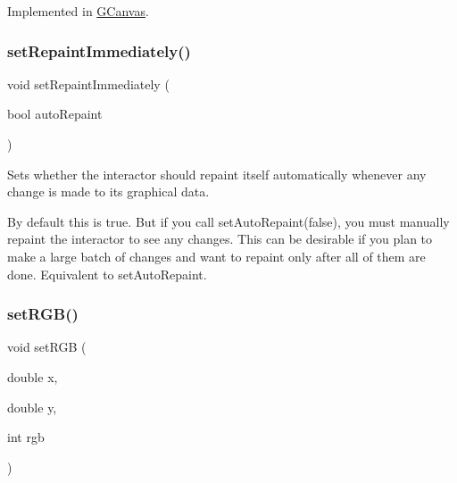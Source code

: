 Implemented in \mbox{\hyperlink{classGCanvas_a64dd4bc93e7f6555e9d96b956602c7c8}{G\+Canvas}}.

\mbox{\label{classGDrawingSurface_abf5590a3992dcb7896ed449e65961da3}} 
\subsubsection{\texorpdfstring{set\+Repaint\+Immediately()}{setRepaintImmediately()}}
{\footnotesize\ttfamily void set\+Repaint\+Immediately (\begin{DoxyParamCaption}\item[{bool}]{auto\+Repaint }\end{DoxyParamCaption})\hspace{0.3cm}{\ttfamily [virtual]}}



Sets whether the interactor should repaint itself automatically whenever any change is made to its graphical data. 

By default this is true. But if you call set\+Auto\+Repaint(false), you must manually repaint the interactor to see any changes. This can be desirable if you plan to make a large batch of changes and want to repaint only after all of them are done. Equivalent to set\+Auto\+Repaint. \mbox{\label{classGDrawingSurface_a8bcbd65fa784bdab1e66a9efd381162d}} 
\subsubsection{\texorpdfstring{set\+R\+G\+B()}{setRGB()}\hspace{0.1cm}{\footnotesize\ttfamily [1/3]}}
{\footnotesize\ttfamily void set\+R\+GB (\begin{DoxyParamCaption}\item[{double}]{x,  }\item[{double}]{y,  }\item[{int}]{rgb }\end{DoxyParamCaption})\hspace{0.3cm}{\ttfamily [virtual]}}




